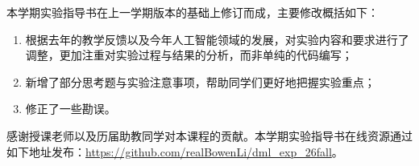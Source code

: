 

\hspace{2em} 本学期实验指导书在上一学期版本的基础上修订而成，主要修改概括如下：
\begin{enumerate}
    \item 根据去年的教学反馈以及今年人工智能领域的发展，对实验内容和要求进行了调整，更加注重对实验过程与结果的分析，而非单纯的代码编写；
    \item 新增了部分思考题与实验注意事项，帮助同学们更好地把握实验重点；
    \item 修正了一些勘误。
\end{enumerate}
\hspace{2em} 感谢授课老师以及历届助教同学对本课程的贡献。本学期实验指导书在线资源通过如下地址发布：\url{https://github.com/realBowenLi/dml_exp_26fall}。

\vspace{5em}



